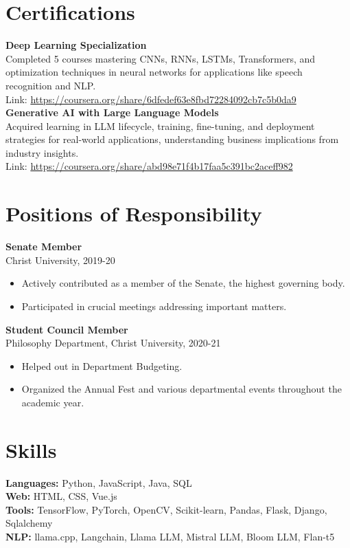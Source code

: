 \documentclass[a4paper,10pt]{article}
\begin{document}
\section*{Certifications}
\textbf{Deep Learning Specialization} \\
Completed 5 courses mastering CNNs, RNNs, LSTMs, Transformers, and optimization techniques in neural networks for applications like speech recognition and NLP. \\
Link: \url{https://coursera.org/share/6dfedef63e8fbd72284092cb7c5b0da9}\\
\textbf{Generative AI with Large Language Models} \\
Acquired learning in LLM lifecycle, training, fine-tuning, and deployment strategies for real-world applications, understanding business implications from industry insights. \\
Link: \url{https://coursera.org/share/abd98e71f4b17faa5c391bc2aceff982}

\section*{Positions of Responsibility}
\textbf{Senate Member} \\
Christ University, 2019-20
\begin{itemize}[noitemsep]
    \item Actively contributed as a member of the Senate, the highest governing body.
    \item Participated in crucial meetings addressing important matters.
\end{itemize}
\textbf{Student Council Member} \\
Philosophy Department, Christ University, 2020-21
\begin{itemize}[noitemsep]
    \item Helped out in Department Budgeting.
    \item Organized the Annual Fest and various departmental events throughout the academic year.
\end{itemize}

\section*{Skills}
\textbf{Languages:} Python, JavaScript, Java, SQL \\
\textbf{Web:} HTML, CSS, Vue.js \\
\textbf{Tools:} TensorFlow, PyTorch, OpenCV, Scikit-learn, Pandas, Flask, Django, Sqlalchemy \\
\textbf{NLP:} llama.cpp, Langchain, Llama LLM, Mistral LLM, Bloom LLM, Flan-t5
\end{document}
